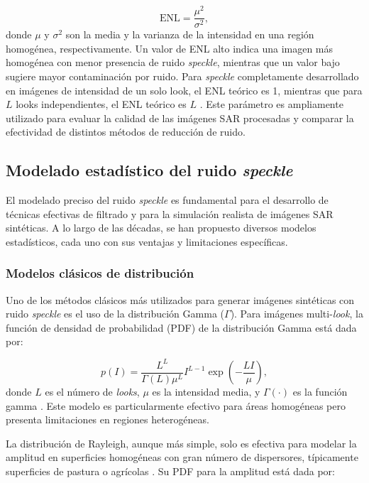 \begin{equation}
	\text{ENL} = \frac{\mu^2}{\sigma^2},
\end{equation}
donde $\mu$ y $\sigma^2$ son la media y la varianza de la intensidad en una región homogénea, respectivamente. Un valor de ENL alto indica una imagen más homogénea con menor presencia de ruido \emph{speckle}, mientras que un valor bajo sugiere mayor contaminación por ruido. Para \emph{speckle} completamente desarrollado en imágenes de intensidad de un solo look, el ENL teórico es 1, mientras que para $L$ looks independientes, el ENL teórico es $L$ \cite{anfinsen2009estimation}. Este parámetro es ampliamente utilizado para evaluar la calidad de las imágenes SAR procesadas y comparar la efectividad de distintos métodos de reducción de ruido.

\subsection{Modelado estadístico del ruido \emph{speckle}}

El modelado preciso del ruido \emph{speckle} es fundamental para el desarrollo de técnicas efectivas de filtrado y para la simulación realista de imágenes SAR sintéticas. A lo largo de las décadas, se han propuesto diversos modelos estadísticos, cada uno con sus ventajas y limitaciones específicas.

\subsubsection{Modelos clásicos de distribución}

Uno de los métodos clásicos más utilizados para generar imágenes sintéticas con ruido \emph{speckle} es el uso de la distribución Gamma ($\Gamma$). Para imágenes multi-\emph{look}, la función de densidad de probabilidad (PDF) de la distribución Gamma está dada por:

\begin{equation}
	p(I) = \frac{L^L}{\Gamma(L)\mu^L} I^{L-1} \exp\left(-\frac{LI}{\mu}\right),
\end{equation}
donde $L$ es el número de \emph{looks}, $\mu$ es la intensidad media, y $\Gamma(\cdot)$ es la función gamma \cite{gao2010statistical}. Este modelo es particularmente efectivo para áreas homogéneas pero presenta limitaciones en regiones heterogéneas.

La distribución de Rayleigh, aunque más simple, solo es efectiva para modelar la amplitud en superficies homogéneas con gran número de dispersores, típicamente superficies de pastura o agrícolas \cite{jakeman1976model}. Su PDF para la amplitud está dada por:

